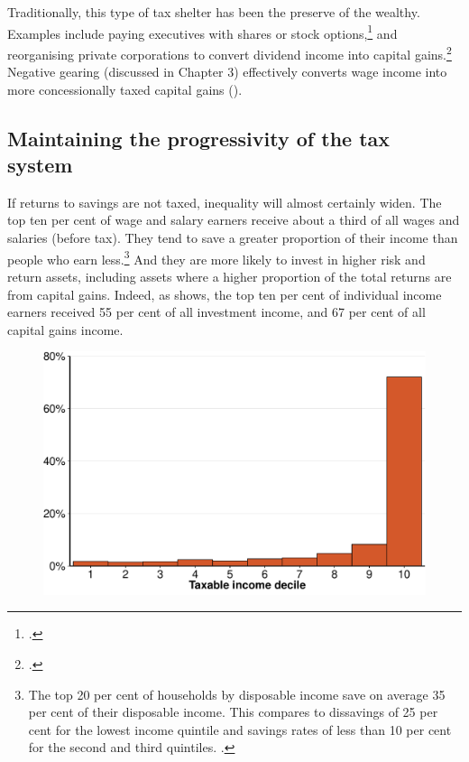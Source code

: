 Traditionally, this type of tax shelter has been the preserve of the wealthy. Examples include paying executives with shares or stock options,\footcite[][8--9]{Ingles2009TaxEquity} and reorganising private corporations to convert dividend income into capital gains.\footcite{MinasLim2013} Negative gearing (discussed in Chapter 3) effectively converts wage income into more concessionally taxed capital gains ().  

\subsection{Maintaining the progressivity of the tax system}\label{subsec:maintaining-progressivity-tax-system}
If returns to savings are not taxed, inequality will almost certainly widen. The top ten per cent of wage and salary earners receive about a third of all wages and salaries (before tax). They tend to save a greater proportion of their income than people who earn less.\footnote{The top 20 per cent of households by disposable income save on average 35 per cent of their disposable income. This compares to dissavings of 25 per cent for the lowest income quintile and savings rates of less than 10 per cent for the second and third quintiles. \textcite[][table~5]{ABS2014DistributionHouseholdIncome}.} And they are more likely to invest in higher risk and return assets, including assets where a higher proportion of the total returns are from capital gains. Indeed, as  shows, the top ten per cent of individual income earners received 55 per cent of all investment income, and 67 per cent of all capital gains income. 

\begin{figure}[!ht]
\label{fig:CG-by-decile}

\includegraphics[width=\columnwidth]{CGT-NG-atlas//CG-by-decile-1}
\end{figure}

